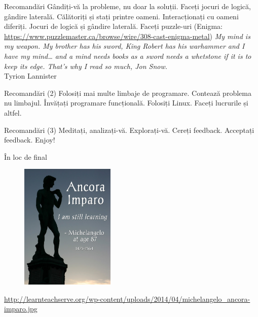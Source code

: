 \documentclass{beamer}
\begin{document}
\begin{frame}{Recomandări}
  Gândiți-vă la probleme, nu doar la soluții.
  Faceți jocuri de logică, gândire laterală.
  Călătoriți și stați printre oameni.
  Interacționați cu oameni diferiți.
  Jocuri de logică și gândire laterală.
  Faceți puzzle-uri (Enigma: \url{https://www.puzzlemaster.ca/browse/wire/308-cast-enigma-metal})
  \textit{My mind is my weapon. My brother has his sword, King Robert has his warhammer and I have my mind\ldots{} and a mind needs books as a sword needs a whetstone if it is to keep its edge. That's why I read so much, Jon Snow.}\\
  Tyrion Lannister
\end{frame}

\begin{frame}{Recomandări (2)}
  Folosiți mai multe limbaje de programare. Contează problema nu limbajul.
  Învățați programare funcțională.
  Folosiți Linux.
  Faceți lucrurile și altfel.
\end{frame}

\begin{frame}{Recomandări (3)}
  Meditați, analizați-vă.
  Explorați-vă.
  Cereți feedback. Acceptați feedback.
  Enjoy!
\end{frame}

\begin{frame}{În loc de final}
  \begin{figure}
    \centering
    \includegraphics[width=0.4\textwidth]{img/michelangelo-ancora-imparo.jpg}
  \end{figure}
  \begin{center}
    \scriptsize
    \url{http://learnteachserve.org/wp-content/uploads/2014/04/michelangelo_ancora-imparo.jpg}
  \end{center}
\end{frame}
\end{document}
